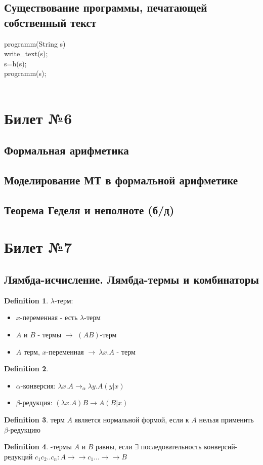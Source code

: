 \documentclass[a4paper]{article}
\theoremstyle{plain}
\theoremstyle{remark}
\theoremstyle{definition}
\newtheorem{definition}{Definition}
\begin{document}
\subsection{Существование программы, печатающей собственный текст}
programm(String s){\\
	write_text(s);\\
	s=h(s);\\
	programm(s);\\
}\\
\section{Билет №6}
\subsection{Формальная арифметика}
\subsection{Моделирование МТ в формальной арифметике}
\subsection{Теорема Геделя и неполноте (б/д)}

\section{Билет №7}
\subsection{Лямбда-исчисление. Лямбда-термы и комбинаторы}
\begin{definition}
$\lambda$-терм:
\begin{itemize}
		\item $x$-переменная - есть $\lambda$-терм
		\item $A$ и $B$ - термы $\rightarrow$ $(AB)$-терм
		\item $A$ терм, $x$-переменная $\rightarrow\  \lambda x.A$ - терм
	\end{itemize}	
\end{definition}
\begin{definition}
\begin{itemize}
		\item $\alpha$-конверсия: $\lambda x.A \rightarrow_\alpha \lambda y.A(y|x)$
		\item $\beta$-редукция: $(\lambda x.A)B\rightarrow A(B|x)$
	\end{itemize}	
\end{definition}
\begin{definition}
терм $A$ является нормальной формой, если к $A$ нельзя применить $\beta$-редукцию	
\end{definition}
\begin{definition}
\lambda-термы $A$ и $B$ равны, если $\exists$ последовательность  конверсий-редукций $c_1c_2..c_n : A\rightarrow\rightarrow c_1...\rightarrow\rightarrow B$	
\end{definition}
\end{document}
